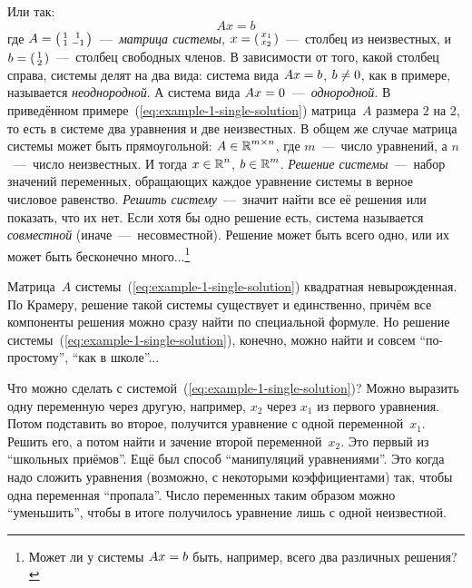 \documentclass[a4paper,12pt]{article}
\begin{document}
  Или так:
  \[
    Ax = b
  \]
  где $A \hm= \left(\begin{smallmatrix}1 & 1\\1 & -1\end{smallmatrix}\right)$~---~\emph{матрица системы}, $x \hm= \left(\begin{smallmatrix}x_1 \\ x_2\end{smallmatrix}\right)$~---~столбец из неизвестных, и $b \hm= \left(\begin{smallmatrix}1 \\ 2\end{smallmatrix}\right)$~---~столбец свободных членов.
  В зависимости от того, какой столбец справа, системы делят на два вида: система вида $Ax \hm= b$, $b \hm{\not=} 0$, как в примере, называется \emph{неоднородной}.
  А система вида $Ax \hm= 0$~---~\emph{однородной}.
  В приведённом примере~(\ref{eq:example-1-single-solution}) матрица~$A$ размера $2$ на $2$, то есть в системе два уравнения и две неизвестных.
  В общем же случае матрица системы может быть прямоугольной: $A \hm\in \RR^{m\times n}$, где $m$~---~число уравнений, а $n$~---~число неизвестных.
  И тогда $x \hm\in \RR^n$, $b \hm\in \RR^m$.
  \emph{Решение системы}~---~набор значений переменных, обращающих каждое уравнение системы в верное числовое равенство.
  \emph{Решить систему}~---~значит найти все её решения или показать, что их нет.
  Если хотя бы одно решение есть, система называется \emph{совместной} (иначе~---~несовместной).
  Решение может быть всего одно, или их может быть бесконечно много...\footnote{Может ли у системы $Ax \hm= b$ быть, например, всего два различных решения?}

  Матрица~$A$ системы~(\ref{eq:example-1-single-solution}) квадратная невырожденная.
  По Крамеру, решение такой системы существует и единственно, причём все компоненты решения можно сразу найти по специальной формуле.
  Но решение системы~(\ref{eq:example-1-single-solution}), конечно, можно найти и совсем ``по-простому'', ``как в школе''...
  
  Что можно сделать с системой~(\ref{eq:example-1-single-solution})?
  Можно выразить одну переменную через другую, например, $x_2$ через $x_1$ из первого уравнения.
  Потом подставить во второе, получится уравнение с одной переменной~$x_1$.
  Решить его, а потом найти и зачение второй переменной~$x_2$.
  Это первый из ``школьных приёмов''.
  Ещё был способ ``манипуляций уравнениями''.
  Это когда надо сложить уравнения (возможно, с некоторыми коэффициентами) так, чтобы одна переменная ``пропала''.
  Число переменных таким образом можно ``уменьшить'', чтобы в итоге получилось уравнение лишь с одной неизвестной.
\end{document}
